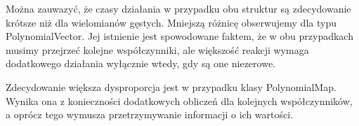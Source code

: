 Można zauwazyć, że czasy działania w przypadku obu struktur są zdecydowanie krótsze niż dla wielomianów gęstych. Mniejszą różnicę obserwujemy dla typu PolynomialVector. Jej istnienie jest spowodowane faktem, że w obu przypadkach musimy przejrzeć kolejne współczynniki, ale większość reakcji wymaga dodatkowego działania wyłącznie wtedy, gdy są one niezerowe.

Zdecydowanie większa dysproporcja jest w przypadku klasy PolynomialMap. Wynika ona z konieczności dodatkowych obliczeń dla kolejnych współczynników, a oprócz tego wymusza przetrzymywanie informacji o ich wartości.
